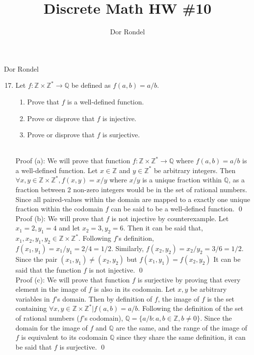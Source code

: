 \documentclass{article}
\title{Discrete Math HW \#10}
\author{Dor Rondel}
\begin{document}
\maketitle
\newpage
Dor Rondel \\
\begin{enumerate}
  \setcounter{enumi}{16}
  \item Let $f: \mathbb{Z} \times \mathbb{Z}^\ast \to \mathbb{Q}$ be defined as $f(a,b)=a/b$.
\begin{enumerate}
\item Prove that $f$ is a well-defined function.
\item Prove or disprove that $f$ is injective.
\item Prove or disprove that $f$ is surjective.
\end{enumerate} \\
\newline
Proof (a): We will prove that function $f: \mathbb{Z} \times \mathbb{Z}^\ast \to \mathbb{Q}$ where $f(a,b)=a/b$ is a well-defined function. Let $x \in \mathbb{Z}$ and $y \in \mathbb{Z}^\ast$ be arbitrary integers. Then $\forall x,y \in \mathbb{Z} \times \mathbb{Z}^\ast, f(x,y)= x/y$  where $x/y$ is a unique fraction within $\mathbb{Q}$, as a fraction between 2 non-zero integers would be in the set of rational numbers. Since all paired-values within the domain are mapped to a exactly one unique fraction within the codomain $f$ can be said to be a well-defined function. \qed \\
\newline
Proof (b): We will prove that $f$ is not injective by counterexample. Let $x_1 = 2, y_1 = 4$ and let $x_2 = 3, y_2 = 6$. Then it can be said that, $x_1,x_2,y_1,y_2 \in \mathbb{Z} \times \mathbb{Z}^\ast$. Following $f$'s definition, $f(x_1,y_1)=x_1/y_1=2/4=1/2$. Similarly, $f(x_2,y_2)=x_2/y_2=3/6=1/2$. Since the pair $(x_1,y_1) \neq (x_2,y_2)$ but $f(x_1,y_1) = f(x_2,y_2)$ It can be said that the function $f$ is not injective. \qed \\
\newline
Proof (c): We will prove that function $f$ is surjective by proving that every element in the image of $f$ is also in its codomain. Let $x,y$ be arbitrary variables in $f$'s domain. Then by definition of $f$, the image of $f$ is the set containing $\forall x,y \in \mathbb{Z} \times \mathbb{Z}^\ast | f(a,b)=a/b$. Following the definition of the set of rational numbers ($f$'s codomain), $\mathbb{Q} = \{ a/b : a,b \in \mathbb{Z}, b \neq 0 \}$. Since the domain for the image of $f$ and $\mathbb{Q}$ are the same, and the range of the image of $f$ is equivalent to its codomain $\mathbb{Q}$ since they share the same definition, it can be said that $f$ is surjective. \qed \\

\end{enumerate}
\end{document}
